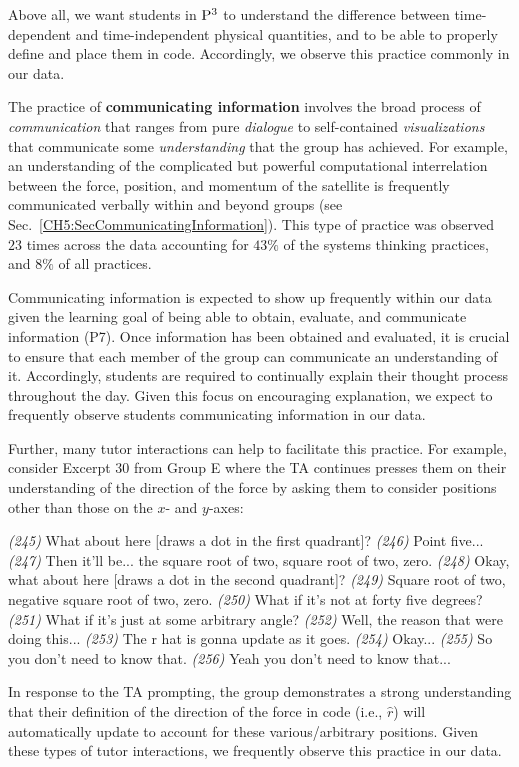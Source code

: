 \documentclass{msuphddissertation}
\begin{document}
\begin{doublespace}
Above all, we want students in ${\rm P}^{3}$ to understand the difference between time-dependent and time-independent physical quantities, and to be able to properly define and place them in code.  Accordingly, we observe this practice commonly in our data.

The practice of \textbf{communicating information} involves the broad process of \textit{communication} that ranges from pure \textit{dialogue} to self-contained \textit{visualizations} that communicate some \textit{understanding} that the group has achieved.  For example, an understanding of the complicated but powerful computational interrelation between the force, position, and momentum of the satellite is frequently communicated verbally within and beyond groups (see Sec.~\ref{CH5:SecCommunicatingInformation}).  This type of practice was observed $23$ times across the data  accounting for $43\%$ of the systems thinking practices, and $8\%$ of all practices.

Communicating information is expected to show up frequently within our data given the learning goal of being able to obtain, evaluate, and communicate information (P7).  Once information has been obtained and evaluated, it is crucial to ensure that each member of the group can communicate an understanding of it.  Accordingly, students are required to continually explain their thought process throughout the day.  Given this focus on encouraging explanation, we expect to frequently observe students communicating information in our data.

Further, many tutor interactions can help to facilitate this practice.  For example, consider Excerpt 30 from Group E where the TA continues presses them on their understanding of the direction of the force by asking them to consider positions other than those on the $x$- and $y$-axes: \begin{description}
\TA \textit{(245)} What about here [draws a dot in the first quadrant]?
\SD \textit{(246)} Point five...
\SB \textit{(247)} Then it'll be... the square root of two, square root of two, zero.
\TA \textit{(248)} Okay, what about here [draws a dot in the second quadrant]?
\SB \textit{(249)} Square root of two, negative square root of two, zero.
\TA \textit{(250)} What if it's not at forty five degrees?
\TA \textit{(251)} What if it's just at some arbitrary angle?
\SB \textit{(252)} Well, the reason that were doing this...			
\SD \textit{(253)} The r hat is gonna update as it goes.
\TA \textit{(254)} Okay...
\SD \textit{(255)} So you don’t need to know that.
\SB \textit{(256)} Yeah you don’t need {to know that}...		
\end{description}  In response to the TA prompting, the group demonstrates a strong understanding that their definition of the direction of the force in code (i.e., $\hat{r}$) will automatically update to account for these various/arbitrary positions.  Given these types of tutor interactions, we frequently observe this practice in our data.


\end{doublespace}
\end{document}
